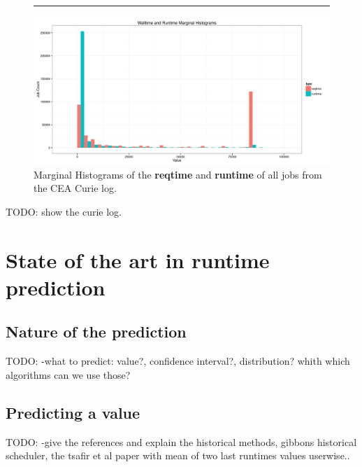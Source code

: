 \documentclass{article}
\begin{document}
\begin{figure}[b]
  \centering\rule{0.8*\textwidth}{0.3*\textwidth}

        \includegraphics[width=\textwidth]{../../wallimage-0.png}
        \caption{Marginal Histograms of the \textbf{reqtime} and \textbf{runtime} of all jobs from the CEA Curie log.}
\label{fig:_wall_run_for_report_pdf}
\end{figure}





TODO: show the curie log.



\section{State of the art in \textbf{runtime} prediction}


\subsection{Nature of the prediction}
\label{sub:nature_of_the_prediction}

TODO: -what to predict: value?, confidence interval?, distribution? whith which algorithms can we use those?


\subsection{Predicting a value}
\label{sub:predicting_a_value}

TODO: -give the references and explain the historical methods, gibbons historical scheduler, the tsafir et al paper with mean of two last runtimes values userwise..
\end{document}

